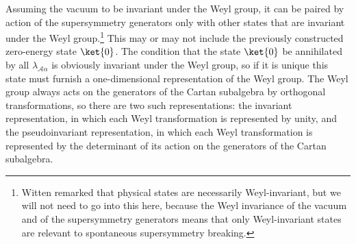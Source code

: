 Assuming the vacuum to be invariant under the Weyl group, it can be paired
by action of the supersymmetry generators only with other states that are
invariant under the Weyl group.\footnote{Witten remarked that physical
states are necessarily Weyl-invariant, but we will not need to go into this
here, because the Weyl invariance of the vacuum and of the supersymmetry
generators means that only Weyl-invariant states are relevant to spontaneous
supersymmetry breaking.} This may or may not include the previously
constructed zero-energy state \(\ket{0}\). The condition that the state
\(\ket{0}\) be annihilated by all \(\lambda_{\mathcal A\alpha}\) is obviously
invariant under the Weyl group, so if it is unique this state must furnish a
one-dimensional representation of the Weyl group. The Weyl group always
acts on the generators of the Cartan subalgebra by orthogonal
transformations, so there are two such representations: the invariant
representation, in which each Weyl transformation is represented by unity,
and the pseudoinvariant representation, in which each Weyl transformation
is represented by the determinant of its action on the generators of the
Cartan subalgebra.

